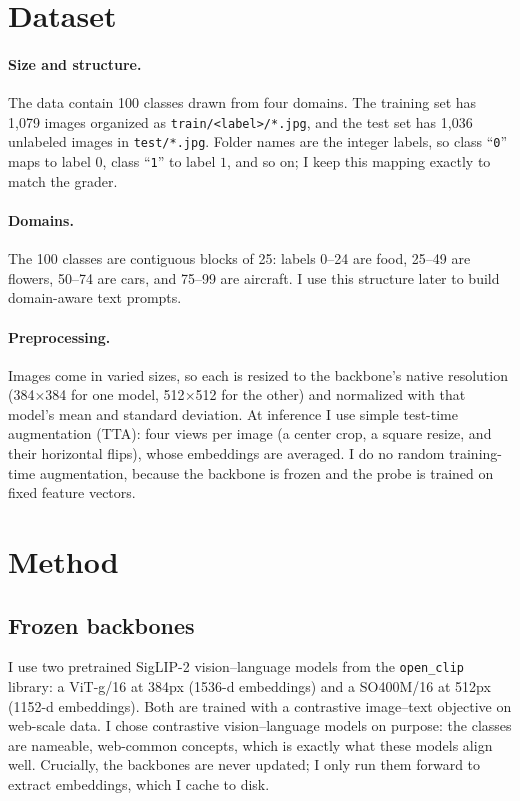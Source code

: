 \documentclass[11pt]{article}
\begin{document}
\section{Dataset}

\paragraph{Size and structure.} The data contain 100 classes drawn from four
domains. The training set has 1{,}079 images organized as \texttt{train/<label>/*.jpg},
and the test set has 1{,}036 unlabeled images in \texttt{test/*.jpg}. Folder names
are the integer labels, so class ``\texttt{0}'' maps to label $0$, class
``\texttt{1}'' to label $1$, and so on; I keep this mapping exactly to match the
grader.

\paragraph{Domains.} The 100 classes are contiguous blocks of 25: labels 0--24 are
food, 25--49 are flowers, 50--74 are cars, and 75--99 are aircraft. I use this
structure later to build domain-aware text prompts.

\paragraph{Preprocessing.} Images come in varied sizes, so each is resized to the
backbone's native resolution (384$\times$384 for one model, 512$\times$512 for the
other) and normalized with that model's mean and standard deviation. At inference
I use simple test-time augmentation (TTA): four views per image (a center crop, a
square resize, and their horizontal flips), whose embeddings are averaged. I do no
random training-time augmentation, because the backbone is frozen and the probe is
trained on fixed feature vectors.

\section{Method}

\subsection{Frozen backbones}
I use two pretrained SigLIP-2 vision--language models from the
\texttt{open\_clip} library: a ViT-g/16 at 384px (1536-d embeddings) and a
SO400M/16 at 512px (1152-d embeddings). Both are trained with a contrastive
image--text objective on web-scale data. I chose contrastive
vision--language models on purpose: the classes are nameable, web-common concepts,
which is exactly what these models align well. Crucially, the backbones are never
updated; I only run them forward to extract embeddings, which I cache to disk.
\end{document}
